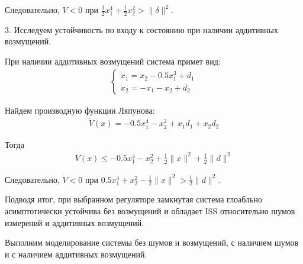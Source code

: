 Следовательно, $\dot{V} < 0$ при $\frac{1}{2}x_1^4 + \frac{1}{2}x_2^2 > \|\delta\|^2$.


3. Исследуем устойчивость по входу к состоянию при наличии
аддитивных возмущений.

При наличии аддитивных возмущений система примет вид:
\begin{align*}
    \begin{cases}
        \dot{x}_1 = x_2 - 0.5x_1^3 + d_1 \\
        \dot{x}_2 = -x_1 - x_2 + d_2
    \end{cases}
\end{align*}

Найдем производную функции Ляпунова:
\begin{align*}
    \dot{V}(x) = -0.5x_1^4 - x_2^2 + x_1d_1 + x_2d_2
\end{align*}

Тогда
\begin{align*}
    \dot{V}(x) \le -0.5x_1^4 - x_2^2 + \frac{1}{2} \|x\|^2 + \frac{1}{2}\|d\|^2
\end{align*}

Следовательно, $\dot{V} < 0$ при $0.5x_1^4 + x_2^2 - \frac{1}{2} \|x\|^2 > \frac{1}{2}\|d\|^2$.

Подводя итог, при выбранном регуляторе замкнутая система 
глоабльно асимптотически устойчива без возмущений и обладает
ISS относительно шумов измерений и аддитивных возмущений.

Выполним моделирование системы без шумов и возмущений, с наличием шумов и с наличием аддитивных возмущений.


